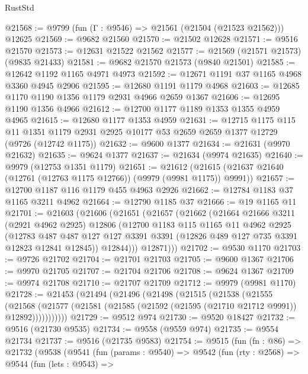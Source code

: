 \begin{lexlean}{RustStd}
\begin{coremodule}
@21568 := @9799 (fun (Γ : @9546) => @21561 (@21504 (@21523 @21562))) @12625
@21569 := @9682 @21560
@21570 := @21502 @12628
@21571 := @9516 @21570
@21573 := @12631 @21522 @21562
@21577 := @21569 (@21571 @21573) (@9835 @21433)
@21581 := @9682 @21570 @21573 (@9840 @21501)
@21585 := @12642 @1192 @1165 @4971 @4973
@21592 := @12671 @1191 @37 @1165 @4968 @3360 @4945 @2906
@21595 := @12680 @1191 @1179 @4968
@21603 := @12685 @1170 @1190 @1356 @1179 @2931 @4966 @2659 @1367
@21606 := @12695 @1190 @1356 @4966
@21612 := @12700 @1177 @1189 @1353 @1355 @4959 @4965
@21615 := @12680 @1177 @1353 @4959
@21631 := @12715
    @1175
    @115
    @11
    @1351
    @1179
    @2931
    @2925
    @10177
    @53
    @2659
    @2659
    @1377
    @12729
    (@9726 (@12742 @1175))
@21632 := @9600 @1377
@21634 := @21631 (@9970 @21632)
@21635 := @9624 @1377
@21637 := @21634 (@9974 @21635)
@21640 := @9979 (@12753 @1351 @1179)
@21651 := @21612 (@21615 (@21637 @21640 (@12761 (@12763 @1175 @12766)) (@9979 (@9981 @1175)) @9991))
@21657 := @12700 @1187 @116 @1179 @455 @4963 @2926
@21662 := @12784 @1183 @37 @1165 @3211 @4962
@21664 := @12790 @1185 @37
@21666 := @19 @1165 @11
@21701 := @21603
    (@21606
      (@21651
        (@21657
          (@21662
            (@21664
              @21666
              @3211
              (@2921 @4962 @2925)
              @12806
              (@12700
                @1183
                @115
                @1165
                @11
                @4962
                @2925
                (@12783
                  @487
                  @487
                  @127
                  @127
                  @3391
                  @3391
                  (@12826 @489 @127 @735 @3391 @12823 @12841 @12845))
                @12844)))
          @12871)))
@21702 := @9530 @1170
@21703 := @9726 @21702
@21704 := @21701 @21703
@21705 := @9600 @1367
@21706 := @9970 @21705
@21707 := @21704 @21706
@21708 := @9624 @1367
@21709 := @9974 @21708
@21710 := @21707 @21709
@21712 := @9979 (@9981 @1170)
@21728 := @21453
    (@21494
      (@21496
        (@21498
          (@21515
            (@21538
              (@21555
                (@21568
                  (@21577 (@21581 (@21585 (@21592 (@21595 (@21710 @21712 @9991)) @12892)))))))))))
@21729 := @9512 @974
@21730 := @9520 @18427
@21732 := @9516 (@21730 @9535)
@21734 := @9558 (@9559 @974)
@21735 := @9554 @21734
@21737 := @9516 (@21735 @9583)
@21754 := @9515
    (fun (fn : @86) =>
    @21732
      (@9538
        (@9541
          (fun (params : @9540) =>
          @9542
            (fun (rty : @2568) =>
            @9544
              (fun (lets : @9543) =>

\end{coremodule}
\end{lexlean}
